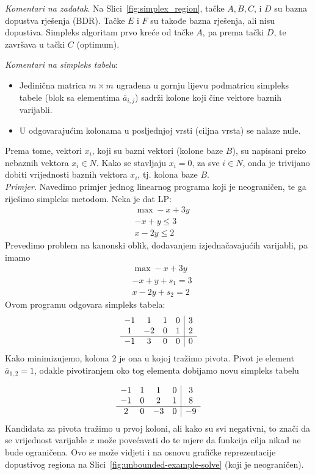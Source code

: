 \documentclass[a4paper, utf8, 11pt, colorlinks]{article}
\begin{document}
 \emph{Komentari na zadatak}. Na Slici~\ref{fig:simplex_region}, tačke $A, B, C$, i $D$ su bazna dopustva rješenja (BDR). Tačke $E$ i $F$ su takođe bazna rješenja, ali nisu dopustiva. Simpleks algoritam prvo kreće od tačke $A$, pa prema tački $D$, te završava u tački $C$ (optimum).
 
 \emph{Komentari na simpleks tabelu}:
 \begin{itemize}
     \item Jedinična matrica $m \times m$   ugrađena u gornju lijevu podmatricu simpleks tabele (blok sa elementima $\overline{a}_{i,j}$) sadrži kolone koji čine vektore baznih varijabli.
     \item U odgovarajućim kolonama u posljednjoj vrsti (ciljna vrsta) se nalaze nule.
 \end{itemize}
 Prema tome, vektori $x_i$, koji su bazni vektori (kolone baze $B$), su napisani preko nebaznih vektora $x_i \in N$. Kako se stavljaju $x_i  = 0$, za sve $i \in N$, onda je trivijano dobiti vrijednosti baznih vektora $x_i$, tj. kolona baze $B$. 
 \vspace{1cm}\\
 \emph{Primjer.} Navedimo primjer jednog linearnog programa koji je neograničen, te ga riješimo simpleks metodom. 
  Neka je dat LP:
  \begin{align*}
  	  &\max -x + 3y \\
  	  & -x + y \leq 3 \\
  	  & x - 2y \leq 2 
  \end{align*}
 Prevedimo problem na kanonski oblik, dodavanjem izjednačavajućih varijabli, pa imamo 
 \begin{align*}
      &\max -x + 3y \\
     & -x + y + s_1 = 3 \\
     & x - 2y + s_2 = 2  
 \end{align*}
Ovom programu odgovara simpleks tabela:
$$\begin{array}{cccc| c} 
	   -1 & 1  & 1 & 0 & 3 \\
	    1 & -2 & 0 & 1 & 2 \\ \hline
	   -1 & 3  & 0 & 0 & 0  
\end{array}$$
Kako minimizujemo,  kolona 2 je ona u kojoj tražimo pivota. Pivot je element 
$\overline{a}_{1, 2} = 1$, odakle pivotiranjem oko tog elementa dobijamo novu simpleks tabelu 

$$\begin{array}{cccc| c} 
		   -1 & 1  & 1  &  0 & 3 \\
		   -1 & 0  & 2  &  1 & 8 \\ \hline
		   2  & 0  & -3 &  0 & -9 \\
\end{array}$$
Kandidata za pivota tražimo u prvoj koloni, ali kako su svi negativni, to znači da se 
vrijednost  varijable $x$  može povećavati do te mjere da funkcija cilja nikad ne bude ograničena. 
Ovo se može vidjeti i na osnovu grafičke reprezentacije dopustivog regiona na Slici~\ref{fig:unbounded-example-solve} (koji je neograničen). 
\end{document}
